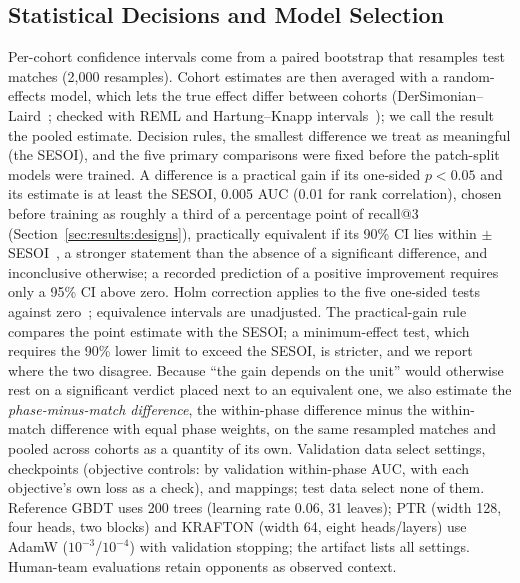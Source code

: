 \documentclass[sigconf,anonymous]{acmart}
\begin{document}
\subsection{Statistical Decisions and Model Selection}
Per-cohort confidence intervals come from a paired bootstrap that resamples test matches (2,000 resamples). Cohort estimates are then averaged with a random-effects model, which lets the true effect differ between cohorts (DerSimonian--Laird~\cite{DerSimonian86}; checked with REML and Hartung--Knapp intervals~\cite{HartungKnapp01}); we call the result the pooled estimate. Decision rules, the smallest difference we treat as meaningful (the SESOI), and the five primary comparisons were fixed before the patch-split models were trained. A difference is a practical gain if its one-sided $p<0.05$ and its estimate is at least the SESOI, 0.005 AUC (0.01 for rank correlation), chosen before training as roughly a third of a percentage point of recall@3 (Section~\ref{sec:results:designs}), practically equivalent if its 90\% CI lies within $\pm$SESOI~\cite{Schuirmann87}, a stronger statement than the absence of a significant difference, and inconclusive otherwise; a recorded prediction of a positive improvement requires only a 95\% CI above zero. Holm correction applies to the five one-sided tests against zero~\cite{Holm79}; equivalence intervals are unadjusted. The practical-gain rule compares the point estimate with the SESOI; a minimum-effect test, which requires the 90\% lower limit to exceed the SESOI, is stricter, and we report where the two disagree. Because ``the gain depends on the unit'' would otherwise rest on a significant verdict placed next to an equivalent one, we also estimate the \emph{phase-minus-match difference}, the within-phase difference minus the within-match difference with equal phase weights, on the same resampled matches and pooled across cohorts as a quantity of its own. Validation data select settings, checkpoints (objective controls: by validation within-phase AUC, with each objective's own loss as a check), and mappings; test data select none of them. Reference GBDT uses 200 trees (learning rate 0.06, 31 leaves); PTR (width 128, four heads, two blocks) and KRAFTON (width 64, eight heads/layers) use AdamW ($10^{-3}$/$10^{-4}$) with validation stopping; the artifact lists all settings. Human-team evaluations retain opponents as observed context.

\end{document}
